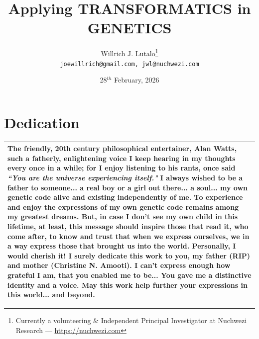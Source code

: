 \documentclass[a4paper, 18pt]{book} %
\title{Applying \textbf{TRANSFORMATICS} in GENETICS}
\author{Willrich J. Lutalo\thanks{Currently a volunteering \& Independent Principal Investigator at Nuchwezi Research --- \url{https://nuchwezi.com}}\\
\texttt{joewillrich@gmail.com, jwl@nuchwezi.com}}
\date{28$^{th}$ February, 2026}
\begin{document}
\frontmatter








\maketitle

\chapter*{Dedication}


\begin{table}[H]
  \centering
  \Huge
	\begin{tabular}[t]{|p{}}
The friendly, 20th century philosophical entertainer, \textbf{Alan Watts}, \normalsize such a fatherly, enlightening voice I keep hearing in my thoughts every once in a while; for I enjoy listening to his rants, once said \Huge \textit{``You are the universe experiencing itself."} \Large I always wished to be a father to someone... \textbf{a real boy or a girl out there... a soul... my own genetic code alive and existing independently of me}. To experience and enjoy the expressions of my own genetic code remains among my greatest dreams. But, in case I don't see my own child in this lifetime, at least, this message should inspire those that read it, who come after, to know and trust that when we express ourselves, we in a way express those that brought us into the world. Personally, I would cherish it! I surely dedicate this work to you, my father (RIP) and mother (Christine N. Amooti). \Large I can't express enough how grateful I am, that you enabled me to be... You gave me a distinctive identity and a voice. \Huge \textbf{May this work help further your expressions in this world... and beyond.}\\
	\hline
	              
\end{tabular}
  \label{TABDEDC}
\end{table}

\tableofcontents

\listoffigures

\listoftables

\newpage

\Large
\end{document}
